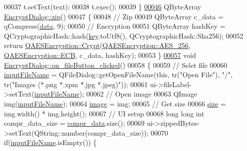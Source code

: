 \begin{DoxyCode}
00037     t.setText(text);
00038     t.exec();
00039 \}
\hypertarget{encryptdialog_8cpp_source_l00046}{}\hyperlink{class_encrypt_dialog_a2bff820a3df4ddc36ecb07ed74b7138a}{00046} QByteArray \hyperlink{class_encrypt_dialog_a2bff820a3df4ddc36ecb07ed74b7138a}{EncryptDialog::zip}()
00047 \{
00048     \textcolor{comment}{// Zip}
00049     QByteArray c\_data = qCompress(\hyperlink{class_encrypt_dialog_acf3a8bbce90d99ef17fec093c35b1008}{data}, 9);
00050     \textcolor{comment}{// Encryption}
00051     QByteArray hashKey = QCryptographicHash::hash(\hyperlink{class_encrypt_dialog_a1afdef3c665fb0d0fae06d1df8e84951}{key}.toUtf8(), QCryptographicHash::Sha256);
00052     \textcolor{keywordflow}{return} \hyperlink{class_q_a_e_s_encryption_a43819eeb6a7cb29fbd3cb6ad640dcbdf}{QAESEncryption::Crypt}(\hyperlink{class_q_a_e_s_encryption_abe48208f4f6c7d68e6a10b49b9d0b7bdacde97774ab1d4c609e04b0dd13a1e1f7}{QAESEncryption::AES\_256}, 
      \hyperlink{class_q_a_e_s_encryption_ad3e031c49a3d56566379d75b40b7b255a4ca7f51778e2adf1f464164a0ba8e75e}{QAESEncryption::ECB}, c\_data, hashKey);
00053 \}
\hypertarget{encryptdialog_8cpp_source_l00057}{}\hyperlink{class_encrypt_dialog_ac9817d3f11f44f4bb8d97a228fbdf8a5}{00057} \textcolor{keywordtype}{void} \hyperlink{class_encrypt_dialog_ac9817d3f11f44f4bb8d97a228fbdf8a5}{EncryptDialog::on\_fileButton\_clicked}()
00058 \{
00059     \textcolor{comment}{// Selet file}
00060     \hyperlink{class_encrypt_dialog_a859b1bc2f032a247632b879bf8663d0b}{inputFileName} = QFileDialog::getOpenFileName(\textcolor{keyword}{this}, tr(\textcolor{stringliteral}{"Open File"}), \textcolor{stringliteral}{"/"}, tr(\textcolor{stringliteral}{"Images (*.png
       *.xpm *.jpg *.jpeg)"}));
00061     ui->fileLabel->setText(\hyperlink{class_encrypt_dialog_a859b1bc2f032a247632b879bf8663d0b}{inputFileName});
00062     \textcolor{comment}{// Open image}
00063     QImage img(\hyperlink{class_encrypt_dialog_a859b1bc2f032a247632b879bf8663d0b}{inputFileName});
00064     \hyperlink{class_encrypt_dialog_a739a0df1d28d06b28a3fd16e2bc16c73}{image} = img;
00065     \textcolor{comment}{// Get size}
00066     \hyperlink{class_encrypt_dialog_a7fff26f838ab50f807744cd2c4bed033}{size} = img.width() * img.height();
00067     \textcolor{comment}{// UI setup}
00068     \textcolor{keywordtype}{long} \textcolor{keywordtype}{long} \textcolor{keywordtype}{int} compr\_data\_size = \hyperlink{class_encrypt_dialog_a3e8998aa39696cbd1242f6420ef18143}{compr\_data}.size();
00069     ui->zippedBytes->setText(QString::number(compr\_data\_size));
00070     \textcolor{keywordflow}{if}(\hyperlink{class_encrypt_dialog_a859b1bc2f032a247632b879bf8663d0b}{inputFileName}.isEmpty()) \{

\end{DoxyCode}
